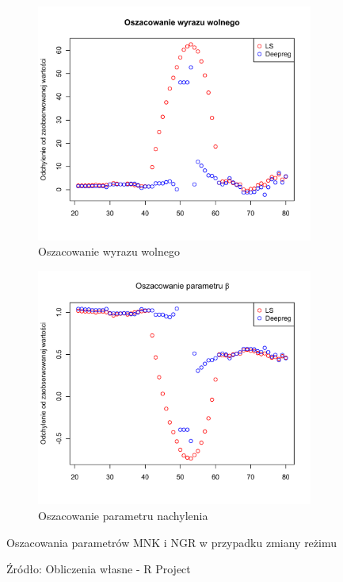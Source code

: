 \documentclass[man,mfu]{mgrwms}
\begin{document}
\begin{figure}[H]
\vspace{-10pt}
\begin{subfigure}[t]{0.35\textwidth}
  \includegraphics[width=\linewidth]{intercept}
  \caption{Oszacowanie wyrazu wolnego}
  \label{fig:intercept}
\end{subfigure}
\begin{subfigure}[t]{0.35\textwidth}
  \includegraphics[width=\linewidth]{beta}
  \caption{Oszacowanie parametru nachylenia}
  \label{fig:beta}
\end{subfigure}
\caption{Oszacowania parametrów MNK i NGR w przypadku zmiany reżimu}
\caption*{Źródło: Obliczenia własne - R Project}
\vspace{-10pt}
\end{figure}
\end{document}
